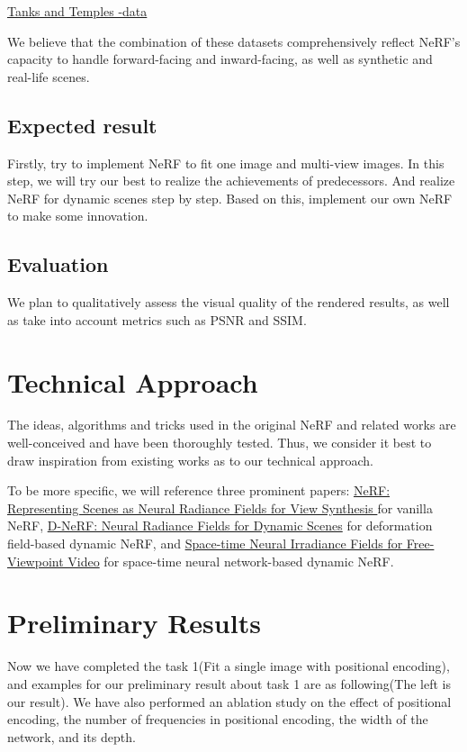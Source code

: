\documentclass{article}
\begin{document}
\href{https://www.tanksandtemples.org/}{Tanks and Temples -data}

We believe that the combination of these datasets comprehensively reflect NeRF's capacity to handle forward-facing and inward-facing, as well as synthetic and real-life scenes.

\subsection{Expected result}
Firstly, try to implement NeRF to fit one image and multi-view images. In this step, we will try our best to realize the achievements of predecessors. And realize NeRF for dynamic scenes step by step. Based on this, implement our own NeRF to make some innovation.

\subsection{Evaluation}
We plan to qualitatively assess the visual quality of the rendered results, as well as take into account metrics such as PSNR and SSIM.

\section{Technical Approach}
The ideas, algorithms and tricks used in the original NeRF and related works are well-conceived and have been thoroughly tested. Thus, we consider it best to draw inspiration from existing works as to our technical approach.

To be more specific, we will reference three prominent papers: \href{https://www.notion.so/Computer-Vision-Final-Project-207a8c05cf414d058a571843a250f990}{NeRF: Representing Scenes as Neural Radiance Fields for View Synthesis
} for vanilla NeRF, \href{https://arxiv.org/abs/2011.13961}{D-NeRF: Neural Radiance Fields for Dynamic Scenes} for deformation field-based dynamic NeRF, and \href{https://arxiv.org/abs/2011.12950}{Space-time Neural Irradiance Fields for Free-Viewpoint Video} for space-time neural network-based dynamic NeRF.

\section{Preliminary Results}
Now we have completed the task 1(Fit a single image with positional encoding), and examples for our preliminary result about task 1 are as following(The left is our result). We have also performed an ablation study on the effect of positional encoding, the number of frequencies in positional encoding, the width of the network, and its depth.
\end{document}

